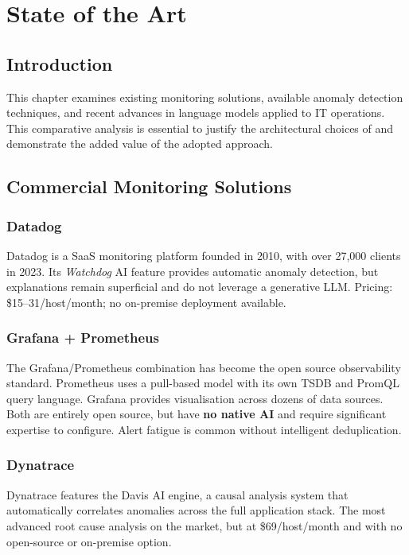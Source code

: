 \chapter{State of the Art}

\section*{Introduction}

This chapter examines existing monitoring solutions, available anomaly detection
techniques, and recent advances in language models applied to IT operations.
This comparative analysis is essential to justify the architectural choices of
\caimp{} and demonstrate the added value of the adopted approach.

\section{Commercial Monitoring Solutions}

\subsection{Datadog}

Datadog is a SaaS monitoring platform founded in 2010, with over 27,000 clients
in 2023. Its \textit{Watchdog} AI feature provides automatic anomaly detection,
but explanations remain superficial and do not leverage a generative LLM.
Pricing: \$15--31/host/month; no on-premise deployment available.

\subsection{Grafana + Prometheus}

The Grafana/Prometheus combination has become the open source observability
standard. Prometheus uses a pull-based model with its own TSDB and PromQL query
language. Grafana provides visualisation across dozens of data sources. Both are
entirely open source, but have \textbf{no native AI} and require significant
expertise to configure. Alert fatigue is common without intelligent deduplication.

\subsection{Dynatrace}

Dynatrace features the Davis AI engine, a causal analysis system that
automatically correlates anomalies across the full application stack. The most
advanced root cause analysis on the market, but at \$69/host/month and with no
open-source or on-premise option.

